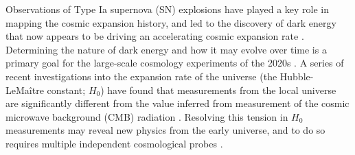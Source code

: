 \documentclass[12pt]{article}
\begin{document}



Observations of Type Ia supernova (SN) explosions have played a key role in mapping the cosmic expansion history, and led to the discovery of dark energy that now appears to be driving an accelerating cosmic expansion rate 
\cite{riess_observational_1998,perlmutter_measurements_1999, Riess_large_2019}.  Determining the nature of dark energy and how it may evolve over time is a primary goal for the large-scale cosmology experiments of the 2020s
\cite{amendola_cosmology_2013,spergel_wide_2015,Ivezic_lsst_2019}.
A series of recent investigations into the expansion rate of the universe (the Hubble-LeMa\^itre constant; $H_0$) have found that measurements from the local universe are significantly different from the value inferred from measurement of the cosmic microwave background (CMB) radiation \cite{Riess_large_2019,aghanim_planck_2018}.  Resolving this tension in $H_0$ measurements may reveal new physics from the early universe, and to do so requires multiple 
independent cosmological probes \cite{verde_tensions_2019}.
\end{document}
